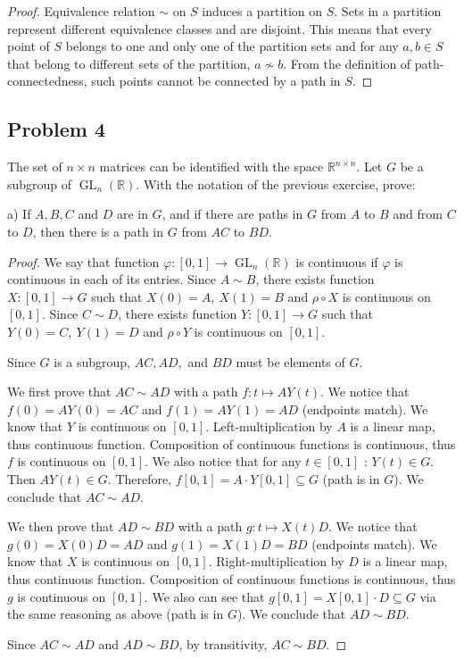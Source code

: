 \documentclass{article}
\theoremstyle{definition}
\newcommand{\R}{\mathbb{R}}
\newcommand{\GL}{\operatorname{GL}}
\newcommand{\GLnR}{\GL_n(\R)}
\begin{document}
\begin{proof}

Equivalence relation $\sim$ on $S$ induces a partition on $S$.
Sets in a partition represent different equivalence classes and are disjoint.
This means that every point of $S$ belongs to one and only one of the partition sets and for any $a,b \in S$ that belong to different sets of the partition, $a \nsim b$.
From the definition of path-connectedness, such points cannot be connected by a path in $S$.

\end{proof}


\subsection*{Problem 4}

\begin{tcolorbox}
The set of $n \times n$ matrices can be identified with the space $\R^{n \times n}$. Let $G$ be a subgroup of $\GLnR$. With the notation of the previous exercise, prove:

a) If $A,B,C$ and $D$ are in $G$, and if there are paths in $G$ from $A$ to $B$ and from $C$ to $D$, then there is a path in $G$ from $AC$ to $BD$.
\end{tcolorbox}

\begin{proof}

We say that function $\varphi : [0,1] \to \GLnR$ is continuous if $\varphi$ is continuous in each of its entries.
Since $A \sim B$, there exists function $X:[0,1] \to G$ such that $X(0) = A, \> X(1) = B$ and $\rho \circ X$ is continuous on $[0,1]$.
Since $C \sim D$, there exists function $Y:[0,1] \to G$ such that $Y(0) = C, \> Y(1) = D$ and $\rho \circ Y$ is continuous on $[0,1]$.

Since $G$ is a subgroup, $AC, AD,$ and $BD$ must be elements of $G$.

We first prove that $AC \sim AD$ with a path $f : t \mapsto A Y(t)$.
We notice that $f(0) = A Y(0) = AC$ and $f(1) = A Y(1) = AD$ (endpoints match).
We know that $Y$ is continuous on $[0,1]$.
Left-multiplication by $A$ is a linear map, thus continuous function.
Composition of continuous functions is continuous, thus $f$ is continuous on $[0,1]$.
We also notice that for any $t \in [0,1]$ : $Y(t) \in G$.
Then $A Y(t) \in G$.
Therefore, $f[0,1] = A \cdot Y[0,1] \subseteq G$ (path is in $G$).
We conclude that $AC \sim AD$.

We then prove that $AD \sim BD$ with a path $g : t \mapsto X(t) D$.
We notice that $g(0) = X(0) D = AD$ and $g(1) = X(1) D = BD$ (endpoints match).
We know that $X$ is continuous on $[0,1]$.
Right-multiplication by $D$ is a linear map, thus continuous function.
Composition of continuous functions is continuous, thus $g$ is continuous on $[0,1]$.
We also can see that $g[0,1] = X[0,1] \cdot D \subseteq G$ via the same reasoning as above (path is in $G$).
We conclude that $AD \sim BD$.

Since $AC \sim AD$ and $AD \sim BD$, by transitivity, $AC \sim BD$.

\end{proof}
\end{document}
